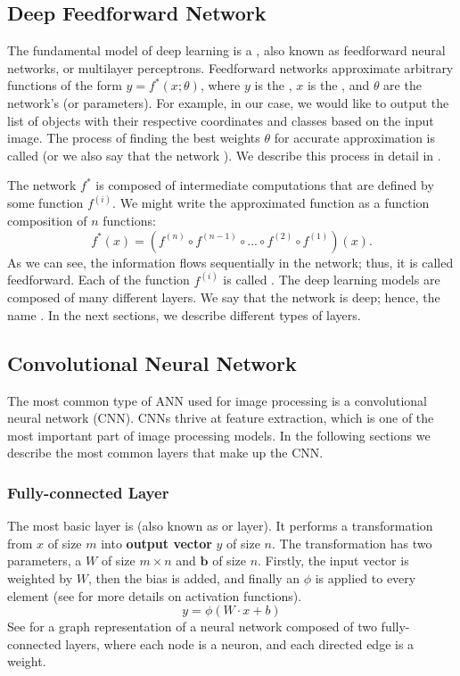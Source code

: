 \subsection{Deep Feedforward Network}
The fundamental model of deep learning is a , also
known as feedforward neural networks, or multilayer perceptrons. Feedforward
networks approximate arbitrary functions of the form $y = f^*(x;\theta)$, where
$y$ is the , $x$ is the , and $\theta$ are the network's
 (or parameters). For example, in our case, we would like to
output the list of objects with their respective coordinates and classes based
on the input image. The process of finding the best weights $\theta$ for
accurate approximation is called  (or we also say that the network
). We describe this process in detail in
.

The network $f^*$ is composed of intermediate computations that are defined by
some function $f^{(i)}$. We might write the approximated function as a function
composition of $n$ functions:
$$
    f^*(x) = (f^{(n)} \circ f^{(n-1)} \circ ... \circ f^{(2)} \circ f^{(1)})(x).
$$
As we can see, the information flows sequentially in the network; thus, it is
called feedforward. Each of the function $f^{(i)}$ is called . The
deep learning models are composed of many different layers. We say that the
network is deep; hence, the name . In the next sections, we
describe different types of layers.

\subsection{Convolutional Neural Network}
The most common type of ANN used for image processing is a convolutional neural
network (CNN). CNNs thrive at feature extraction, which is one of the most
important part of image processing models. In the following sections we describe
the most common layers that make up the CNN.

\subsubsection{Fully-connected Layer}
The most basic layer is  (also known as
 or  layer). It performs a transformation from
 $x$ of size $m$ into \textbf{output vector}
$y$ of size $n$. The transformation has two parameters, a
 $W$ of size $m \times n$ and 
$\boldsymbol{b}$ of size $n$. Firstly, the input vector is weighted by $W$, then
the bias is added, and finally an  $\phi$
is applied to every element (see  for more details on
activation functions).
$$
    y = \phi(W\cdot x + b)
$$
See  for a graph representation of a neural network composed
of two fully-connected layers, where each node is a neuron, and each directed
edge is a weight.

